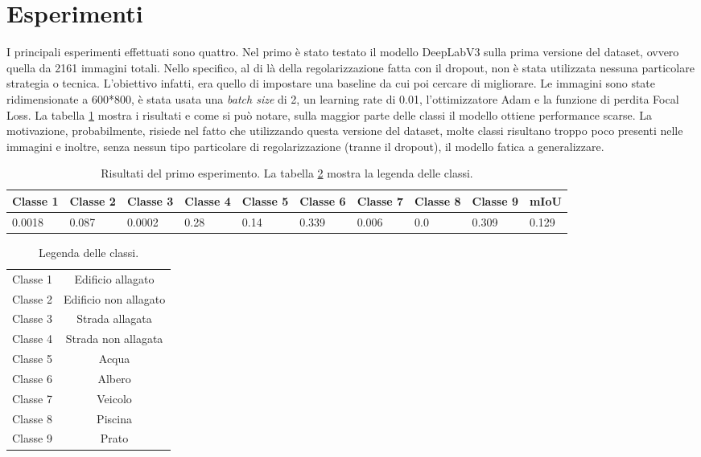 \section{Esperimenti}
I principali esperimenti effettuati sono quattro. Nel primo è stato testato il modello DeepLabV3 sulla prima versione del dataset, ovvero quella da 2161 immagini totali. Nello specifico, al di là della regolarizzazione fatta con il dropout, non è stata utilizzata nessuna particolare strategia o tecnica. L'obiettivo infatti, era quello di impostare una baseline da cui poi cercare di migliorare. Le immagini sono state ridimensionate a 600*800, è stata usata una \textit{batch size} di 2, un learning rate di 0.01, l'ottimizzatore Adam e la funzione di perdita Focal Loss. La tabella \ref{table:config1_mIoU} mostra i risultati e come si può notare, sulla maggior parte delle classi il modello ottiene performance scarse. La motivazione, probabilmente, risiede nel fatto che utilizzando questa versione del dataset, molte classi risultano troppo poco presenti nelle immagini e inoltre, senza nessun tipo particolare di regolarizzazione (tranne il dropout), il modello fatica a generalizzare.


\begin{table}[h!]
\hspace{-0.1in}
\begin{tabular}{||p{1cm} p{1cm} p{1cm} p{1cm} p{1cm} p{1cm} p{1cm} p{1cm} p{1cm} | p{1cm}||}
 \hline
    Classe 1 & Classe 2 & Classe 3 & Classe 4 & Classe 5 & Classe 6 & Classe 7 & Classe 8 & Classe 9 & mIoU \\ [0.5ex]
 \hline
0.0018 & 0.087 & 0.0002 & 0.28 &  0.14 & 0.339 & 0.006 & 0.0 & 0.309 & 0.129 \\ [1ex] 
 \hline
\end{tabular}
\caption{Risultati del primo esperimento. La tabella \ref{table:class_legend} mostra la legenda delle classi.}
\label{table:config1_mIoU}
\end{table}


\begin{table}[h!]
\centering
\begin{tabular}{||c | c||}
 \hline
    Classe 1 & Edificio allagato \\ [0.5ex]
    Classe 2 & Edificio non allagato \\ [0.5ex]
    Classe 3 & Strada allagata \\ [0.5ex]
    Classe 4 & Strada non allagata \\ [0.5ex]
    Classe 5 & Acqua \\ [0.5ex]
    Classe 6 & Albero \\ [0.5ex]
    Classe 7 & Veicolo \\ [0.5ex]
    Classe 8 & Piscina \\ [0.5ex]
    Classe 9 & Prato \\ [0.5ex]
 \hline
\end{tabular}
\caption{Legenda delle classi.}
\label{table:class_legend}
\end{table}

